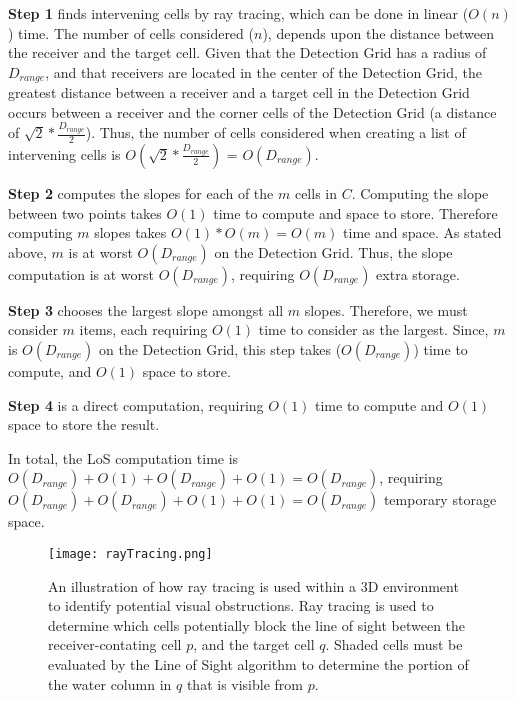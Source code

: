 \textbf{Step 1} finds intervening cells by ray tracing, which can be done in linear ($O(n)$) time.  The number of cells considered ($n$), depends upon the distance between the receiver and the target cell\cite{rayTracing}.  Given that the Detection Grid has a radius of $D_{range}$, and that receivers are located in the center of the Detection Grid, the greatest distance between a receiver and a target cell in the Detection Grid occurs between a receiver and the corner cells of the Detection Grid (a distance of $\sqrt2*\frac{D_{range}}{2}$).  Thus, the number of cells considered when creating a list of intervening cells is $O(\sqrt2*\frac{D_{range}}{2})$ = $O(D_{range})$.

\textbf{Step 2} computes the slopes for each of the $m$ cells in $C$.  Computing the slope between two points takes $O(1)$ time to compute and space to store.  Therefore computing $m$ slopes takes $O(1)*O(m)=O(m)$ time and space.  As stated above, $m$ is at worst $O(D_{range})$ on the Detection Grid.  Thus, the slope computation is at worst $O(D_{range})$, requiring $O(D_{range})$ extra storage.

\textbf{Step 3} chooses the largest slope amongst all $m$ slopes.  Therefore, we must consider $m$ items, each requiring $O(1)$ time to consider as the largest.  Since, $m$ is $O(D_{range})$ on the Detection Grid, this step takes ($O(D_{range})$) time to compute, and $O(1)$ space to store.  

\textbf{Step 4} is a direct computation, requiring $O(1)$ time to compute and $O(1)$ space to store the result.

In total, the LoS computation time is $O(D_{range}) + O(1) + O(D_{range}) + O(1) = O(D_{range})$, requiring $O(D_{range}) + O(D_{range}) + O(1) + O(1) = O(D_{range})$ temporary storage space.
\begin{figure}[h]
	\label{rayTracingImg}
	\centering
	\texttt{[image: rayTracing.png]}
	\caption{An illustration of how ray tracing is used within a 3D environment to identify potential visual obstructions.  Ray tracing is used to determine which cells potentially block the line of sight between the receiver-contating cell $p$, and the target cell $q$.  Shaded cells must be evaluated by the Line of Sight algorithm to determine the portion of the water column in $q$ that is visible from $p$. \cite{Akbarzadeh2013}}
\end{figure}

